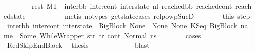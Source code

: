 \begin{isabellebody}
\ \ \ \ \ \ \ \ rest{\isacharcolon}{\kern0pt}\ {\isachardoublequoteopen}M{\isacharcomma}{\kern0pt}{\isasymLambda}{\isacharcomma}{\kern0pt}{\isasymGamma}{\isacharcomma}{\kern0pt}{\isasymOmega}{\isacharcomma}{\kern0pt}T\ {\isasymturnstile}\ {\isacharparenleft}{\kern0pt}inter{\isacharunderscore}{\kern0pt}bb{}{\isacharcomma}{\kern0pt}\ inter{\isacharunderscore}{\kern0pt}cont{}{\isacharcomma}{\kern0pt}\ inter{\isacharunderscore}{\kern0pt}state{}{\isacharparenright}{\kern0pt}\ {\isacharminus}{\kern0pt}n{\isasymlongrightarrow}{\isacharcircum}{\kern0pt}l{}\ {\isacharparenleft}{\kern0pt}reached{\isacharunderscore}{\kern0pt}bb{\isacharcomma}{\kern0pt}\ reached{\isacharunderscore}{\kern0pt}cont{\isacharcomma}{\kern0pt}\ reached{\isacharunderscore}{\kern0pt}state{\isacharparenright}{\kern0pt}{\isachardoublequoteclose}\ \isanewline
\ \ \ \ \ \ \ \ \isamarkupfalse%
\ {\isacharparenleft}{\kern0pt}metis\ {\isacharparenleft}{\kern0pt}no{\isacharunderscore}{\kern0pt}types{\isacharparenright}{\kern0pt}\ get{\isacharunderscore}{\kern0pt}state{\isachardot}{\kern0pt}cases\ relpowp{\isacharunderscore}{\kern0pt}Suc{\isacharunderscore}{\kern0pt}D{}{\isacharparenright}{\kern0pt}\isanewline
\isanewline
\ \ \ \ \ \ \isamarkupfalse%
\ this\ step{}\ \isamarkupfalse%
\ {\isachardoublequoteopen}{\isacharparenleft}{\kern0pt}inter{\isacharunderscore}{\kern0pt}bb{\isacharcomma}{\kern0pt}\ inter{\isacharunderscore}{\kern0pt}cont{\isacharcomma}{\kern0pt}\ inter{\isacharunderscore}{\kern0pt}state{\isacharparenright}{\kern0pt}\ {\isacharequal}{\kern0pt}\ {\isacharparenleft}{\kern0pt}BigBlock\ None\ {\isacharbrackleft}{\kern0pt}{\isacharbrackright}{\kern0pt}\ None\ None{\isacharcomma}{\kern0pt}\ {\isacharparenleft}{\kern0pt}KSeq\ {\isacharparenleft}{\kern0pt}BigBlock\ name\ {\isacharbrackleft}{\kern0pt}{\isacharbrackright}{\kern0pt}\ {\isacharparenleft}{\kern0pt}Some\ {\isacharparenleft}{\kern0pt}WhileWrapper\ str{\isacharparenright}{\kern0pt}{\isacharparenright}{\kern0pt}\ tr{\isacharparenright}{\kern0pt}\ cont{}{\isacharparenright}{\kern0pt}{\isacharcomma}{\kern0pt}\ Normal\ ns{}{\isacharparenright}{\kern0pt}{\isachardoublequoteclose}\isanewline
\ \ \ \ \ \ \isamarkupfalse%
\ cases\isanewline
\ \ \ \ \ \ \ \ \isamarkupfalse%
\ RedSkipEndBlock\ \isamarkupfalse%
\ {\isacharquery}{\kern0pt}thesis\ \isanewline
\ \ \ \ \ \ \ \ \ \ \isamarkupfalse%
\ blast\isanewline

\end{isabellebody}
